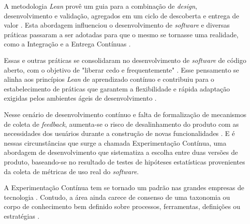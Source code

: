 A metodologia \textit{Lean} provê um guia para a combinação de \textit{design}, desenvolvimento e validação, agregados em um ciclo de descoberta e entrega de valor \cite{fagerholm_right_2017}. Esta abordagem influenciou o desenvolvimento de \textit{software} e diversas práticas passaram a ser adotadas para que o mesmo se tornasse uma realidade, como a Integração e a Entrega Contínuas \cite{fitzgerald2015continuous}.

Essas e outras práticas se consolidaram no desenvolvimento de \textit{software} de código aberto, com o objetivo de "liberar cedo e frequentemente" \cite{feller2005perspectives}. Esse pensamento se alinha aos princípios \textit{Lean} de aprendizado contínuo e contribuiu para o estabelecimento de práticas que garantem a flexibilidade e rápida adaptação exigidas pelos ambientes ágeis de desenvolvimento \cite{fitzgerald2015continuous}.

Nesse cenário de desenvolvimento contínuo e falta de formalização de mecanismos de coleta de \textit{feedback}, aumenta-se o risco de desalinhamento do produto com as necessidades dos usuários durante a construção de novas funcionalidades \cite{olsson2013data}. E é nessas circunstâncias que surge a chamada Experimentação Contínua, uma abordagem de desenvolvimento que sistematiza a escolha entre duas versões de produto, baseando-se no resultado de testes de hipóteses estatísticas provenientes da coleta de métricas de uso real do \textit{software}.

A Experimentação Contínua tem se tornado um padrão nas grandes empresas de tecnologia \cite{kohavi_seven_2014}. Contudo, a área ainda carece de consenso de uma taxonomia ou corpo de conhecimento bem definido sobre processos, ferramentas, definições ou estratégias \cite{erthal_characterization_2023}.
